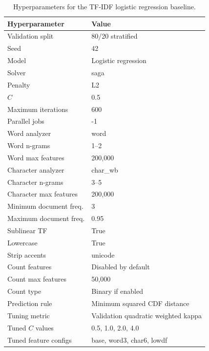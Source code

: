 \documentclass{article}
\begin{document}
\begin{table}[H]
\centering
\small
\caption{Hyperparameters for the TF-IDF logistic regression baseline.}
\label{tab:linear-hyperparameters}
\begin{tabular}{ll}
\toprule
\textbf{Hyperparameter} & \textbf{Value} \\
\midrule
Validation split       & 80/20 stratified \\
Seed                   & 42 \\
Model                  & Logistic regression \\
Solver                 & saga \\
Penalty                & L2 \\
$C$                    & 0.5 \\
Maximum iterations     & 600 \\
Parallel jobs          & -1 \\
\midrule
Word analyzer          & word \\
Word n-grams           & 1--2 \\
Word max features      & 200{,}000 \\
Character analyzer     & char\_wb \\
Character n-grams      & 3--5 \\
Character max features & 200{,}000 \\
Minimum document freq. & 3 \\
Maximum document freq. & 0.95 \\
Sublinear TF           & True \\
Lowercase              & True \\
Strip accents          & unicode \\
\midrule
Count features         & Disabled by default \\
Count max features     & 50{,}000 \\
Count type             & Binary if enabled \\
\midrule
Prediction rule        & Minimum squared CDF distance \\
Tuning metric          & Validation quadratic weighted kappa \\
Tuned $C$ values       & 0.5, 1.0, 2.0, 4.0 \\
Tuned feature configs  & base, word3, char6, lowdf \\
\bottomrule
\end{tabular}
\end{table}

\FloatBarrier
\end{document}
